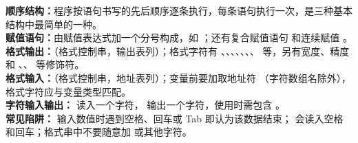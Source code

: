 \documentclass[a4paper,11pt]{article}
\begin{document}

\begin{knowmap}
\textbf{顺序结构：}程序按语句书写的先后顺序逐条执行，每条语句执行一次，是三种基本结构中最简单的一种。\\[2pt]
\textbf{赋值语句：}由赋值表达式加一个分号构成，如 ；还有复合赋值语句  和连续赋值 。\\[2pt]
\textbf{格式输出：}（格式控制串，输出表列）；格式字符有 、、、、、、、 等，另有宽度、精度和 \code{-}、\code{+}、 等修饰符。\\[2pt]
\textbf{格式输入：}（格式控制串，地址表列）；变量前要加取地址符 \code{\&}（字符数组名除外），格式字符应与变量类型匹配。\\[2pt]
\textbf{字符输入输出：} 读入一个字符， 输出一个字符，使用时需包含 。\\[2pt]
\textbf{常见陷阱：} 输入数值时遇到空格、回车或 Tab 即认为该数据结束； 会读入空格和回车；格式串中不要随意加  或其他字符。
\end{knowmap}
\end{document}

